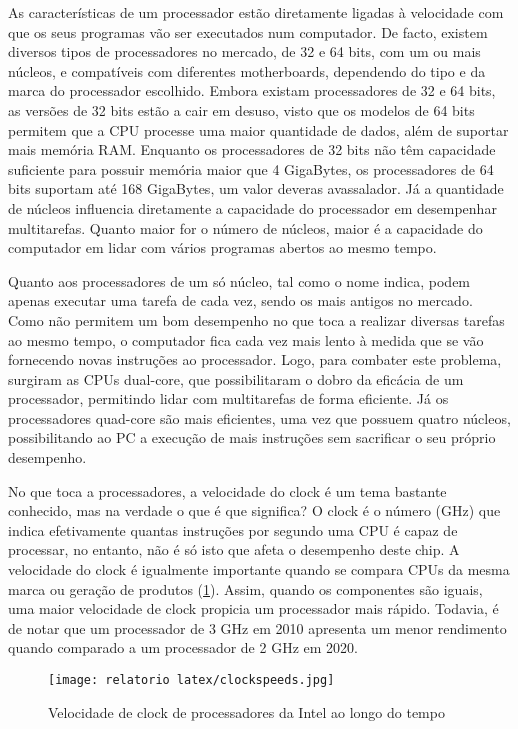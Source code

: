 \documentclass{report}
\begin{document}
As características de um processador estão diretamente ligadas à velocidade com que os seus programas vão ser executados num computador. De facto, existem diversos tipos de processadores no mercado, de 32 e 64 bits, com um ou mais núcleos, e compatíveis com diferentes motherboards, dependendo do tipo e da marca do processador escolhido. Embora existam processadores de 32 e 64 bits, as versões de 32 bits estão a cair em desuso, visto que os modelos de 64 bits permitem que a \ac{CPU} processe uma maior quantidade de dados, além de suportar mais memória \ac{RAM}. Enquanto os processadores de 32 bits não têm capacidade suficiente para possuir memória maior que 4 GigaBytes, os processadores de 64 bits suportam até 168 GigaBytes, um valor deveras avassalador. Já a quantidade de núcleos influencia diretamente a capacidade do processador em desempenhar multitarefas. Quanto maior for o número de núcleos, maior é a capacidade do computador em lidar com vários programas abertos ao mesmo tempo\cite{Desempenho1}.

Quanto aos processadores de um só núcleo, tal como o nome indica, podem apenas executar uma tarefa de cada vez, sendo os mais antigos no mercado. Como não permitem um bom desempenho no que toca a realizar diversas tarefas ao mesmo tempo, o computador fica cada vez mais lento à medida que se vão fornecendo novas instruções ao processador. Logo, para combater este problema, surgiram as \ac{CPU}s dual-core, que possibilitaram o dobro da eficácia de um processador, permitindo lidar com multitarefas de forma eficiente. Já os processadores quad-core são mais eficientes, uma vez que possuem quatro núcleos, possibilitando ao PC a execução de mais instruções sem sacrificar o seu próprio desempenho\cite{Desempenho1}. 

No que toca a processadores, a velocidade do clock é um tema bastante conhecido, mas na verdade o que é que significa? O clock é o número (GHz) que indica efetivamente quantas instruções por segundo uma \ac{CPU} é capaz de processar, no entanto, não é só isto que afeta o desempenho deste chip. A velocidade do clock é igualmente importante quando se compara \ac{CPU}s da mesma marca ou geração de produtos (\ref{fig:Intel Clock}). Assim, quando os componentes são iguais, uma maior velocidade de clock propicia um processador mais rápido. Todavia, é de notar que um processador de 3 GHz em 2010 apresenta um menor rendimento quando comparado a um processador de 2 GHz em 2020\cite{Desempenho2}.

\begin{figure}[h!]
\centering
  \texttt{[image: relatorio latex/clockspeeds.jpg]}
  \caption{Velocidade de clock de processadores da Intel ao longo do tempo}
  \label{fig:Intel Clock}
\end{figure}
\end{document}
